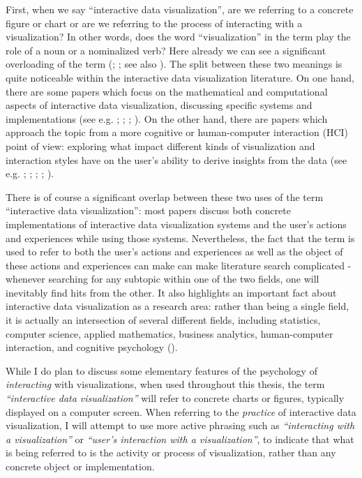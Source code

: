 \documentclass[
]{book}
\theoremstyle{definition}
\theoremstyle{definition}
\theoremstyle{definition}
\theoremstyle{definition}
\theoremstyle{remark}
\begin{document}
First, when we say ``interactive data visualization'', are we referring to a concrete figure or chart or are we referring to the process of interacting with a visualization? In other words, does the word ``visualization'' in the term play the role of a noun or a nominalized verb? Here already we can see a significant overloading of the term (; ; see also ). The split between these two meanings is quite noticeable within the interactive data visualization literature. On one hand, there are some papers which focus on the mathematical and computational aspects of interactive data visualization, discussing specific systems and implementations (see e.g. ; ; ; ). On the other hand, there are papers which approach the topic from a more cognitive or human-computer interaction (HCI) point of view: exploring what impact different kinds of visualization and interaction styles have on the user's ability to derive insights from the data (see e.g. ; ; ; ; ).

There is of course a significant overlap between these two uses of the term ``interactive data visualization'': most papers discuss both concrete implementations of interactive data visualization systems and the user's actions and experiences while using those systems. Nevertheless, the fact that the term is used to refer to both the user's actions and experiences as well as the object of these actions and experiences can make can make literature search complicated - whenever searching for any subtopic within one of the two fields, one will inevitably find hits from the other. It also highlights an important fact about interactive data visualization as a research area: rather than being a single field, it is actually an intersection of several different fields, including statistics, computer science, applied mathematics, business analytics, human-computer interaction, and cognitive psychology ().

While I do plan to discuss some elementary features of the psychology of \emph{interacting} with visualizations, when used throughout this thesis, the term \emph{``interactive data visualization''} will refer to concrete charts or figures, typically displayed on a computer screen. When referring to the \emph{practice} of interactive data visualization, I will attempt to use more active phrasing such as \emph{``interacting with a visualization''} or \emph{``user's interaction with a visualization''}, to indicate that what is being referred to is the activity or process of visualization, rather than any concrete object or implementation.
\end{document}
